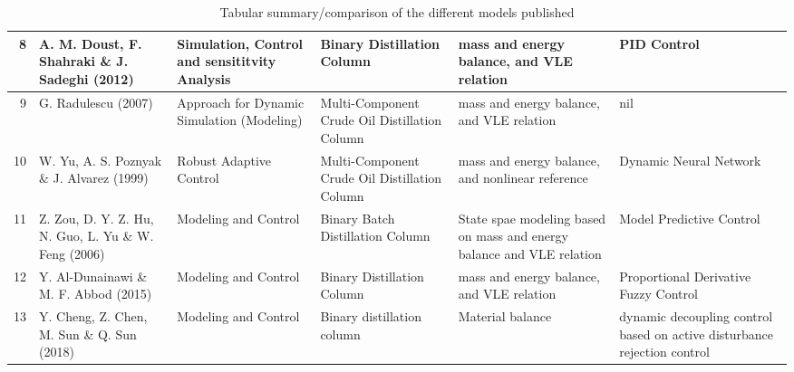 \documentclass[11pt,a4paper,oneside]{article}
\begin{document}
{\begin{landscape}
\begin{table}[htbp]
\begin{adjustbox}{width=\columnwidth,center}
\begin{tabular}{|r|p{9.72em}|p{10.78em}|p{10.555em}|p{10.835em}|p{10.11em}|}
    \midrule
    8     & A. M. Doust, F. Shahraki \& J. Sadeghi (2012) & Simulation, Control and sensititvity Analysis & Binary Distillation Column & mass and energy balance, and VLE relation & PID Control \\
    \midrule
    9     & G. Radulescu (2007) & Approach for Dynamic Simulation (Modeling) & Multi-Component Crude Oil Distillation Column & mass and energy balance, and VLE relation & nil \\
    \midrule
    10    & W. Yu, A. S. Poznyak \& J. Alvarez (1999) & Robust Adaptive Control & Multi-Component Crude Oil Distillation Column & mass and energy balance, and nonlinear reference & Dynamic Neural Network \\
    \midrule
    11    & Z. Zou, D. Y. Z. Hu, N. Guo, L. Yu \& W. Feng (2006) & Modeling and Control & Binary Batch Distillation Column & State spae modeling based on mass and energy balance and VLE relation & Model Predictive Control  \\
    \midrule
    12    & Y. Al-Dunainawi \& M. F. Abbod (2015) & Modeling and Control & Binary Distillation Column & mass and energy balance, and VLE relation & Proportional Derivative Fuzzy Control \\
    \midrule
    13    & Y. Cheng, Z. Chen, M. Sun \& Q. Sun (2018) & Modeling and Control & Binary distillation column & Material balance & dynamic decoupling control based on active disturbance rejection control \\
    \bottomrule
    \end{tabular}%
       \end{adjustbox}%
      \caption{Tabular summary/comparison of the different models published}
      \label{tab:literature_comparism}%
    \end{table}%
  \end{landscape}
  \clearpage
}                               %
\newpage


\end{document}
